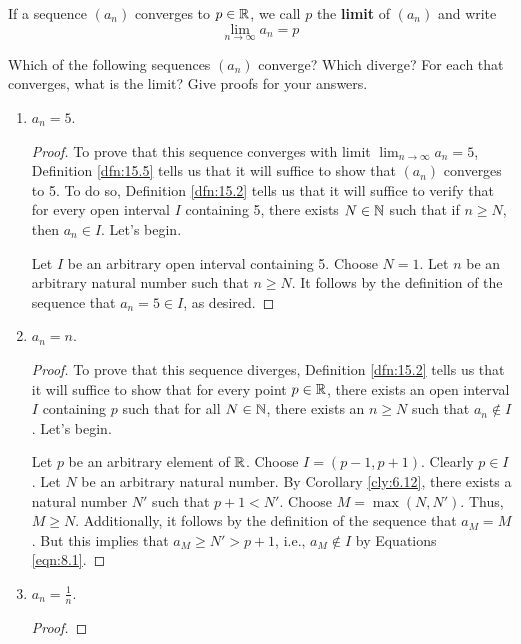 \documentclass[../main.tex]{subfiles}
\begin{document}
\begin{definition}\label{dfn:15.5}
    If a sequence $(a_n)$ converges to $p\in\mathbb{R}$, we call $p$ the \textbf{limit} of $(a_n)$ and write
    \begin{equation*}
        \lim_{n\to\infty}a_n = p
    \end{equation*}
\end{definition}

\begin{exercise}\label{exr:15.6}
    Which of the following sequences $(a_n)$ converge? Which diverge? For each that converges, what is the limit? Give proofs for your answers.
    \begin{enumerate}[label={(\alph*)}]
        \item $a_n=5$.
        \begin{proof}
            To prove that this sequence converges with limit $\lim_{n\to\infty}a_n=5$, Definition \ref{dfn:15.5} tells us that it will suffice to show that $(a_n)$ converges to 5. To do so, Definition \ref{dfn:15.2} tells us that it will suffice to verify that for every open interval $I$ containing 5, there exists $N\in\mathbb{N}$ such that if $n\geq N$, then $a_n\in I$. Let's begin.\par
            Let $I$ be an arbitrary open interval containing 5. Choose $N=1$. Let $n$ be an arbitrary natural number such that $n\geq N$. It follows by the definition of the sequence that $a_n=5\in I$, as desired.
        \end{proof}
        \item $a_n=n$.
        \begin{proof}
            To prove that this sequence diverges, Definition \ref{dfn:15.2} tells us that it will suffice to show that for every point $p\in\mathbb{R}$, there exists an open interval $I$ containing $p$ such that for all $N\in\mathbb{N}$, there exists an $n\geq N$ such that $a_n\notin I$. Let's begin.\par
            Let $p$ be an arbitrary element of $\mathbb{R}$. Choose $I=(p-1,p+1)$. Clearly $p\in I$. Let $N$ be an arbitrary natural number. By Corollary \ref{cly:6.12}, there exists a natural number $N'$ such that $p+1<N'$. Choose $M=\max(N,N')$. Thus, $M\geq N$. Additionally, it follows by the definition of the sequence that $a_M=M$. But this implies that $a_M\geq N'>p+1$, i.e., $a_M\notin I$ by Equations \ref{eqn:8.1}.
        \end{proof}
        \item $a_n=\frac{1}{n}$.
        \begin{proof}

\end{proof}
\end{enumerate}
\end{exercise}
\end{document}

